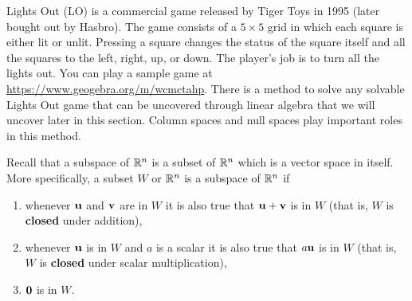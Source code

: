  \label{sec:null_space}

\vspace*{-17 pt}

\vspace*{13 pt}


Lights Out (LO) is a commercial game released by Tiger Toys in 1995 (later bought out by Hasbro). The game consists of a $5 \times 5$ grid in which each square is either lit or unlit. Pressing a square changes the status of the square itself and all the squares to the left, right, up, or down. The player's job is to turn all the lights out. You can play a sample game at \url{https://www.geogebra.org/m/wcmctahp}. There is a method to solve any solvable Lights Out game that can be uncovered through linear algebra that we will uncover later in this section. Column spaces and null spaces play important roles in this method. 


Recall that a subspace of $\mathbb{R}^n$ is a subset of $\mathbb{R}^n$ which is a vector space in itself. More specifically, a subset $W$ or $\mathbb{R}^n$ is a subspace of $\mathbb{R}^n$ if 
\begin{enumerate}
\item whenever $\mathbf{u}$ and $\mathbf{v}$ are in $W$ it is also true that $\mathbf{u} + \mathbf{v}$ is in $W$ (that is, $W$ is \textbf{closed} under addition),
\item whenever $\mathbf{u}$ is in $W$ and $a$ is a scalar it is also true that $a\mathbf{u}$ is in $W$ (that is, $W$ is \textbf{closed} under scalar multiplication),
\item $\mathbf{0}$ is in $W$.
\end{enumerate}

